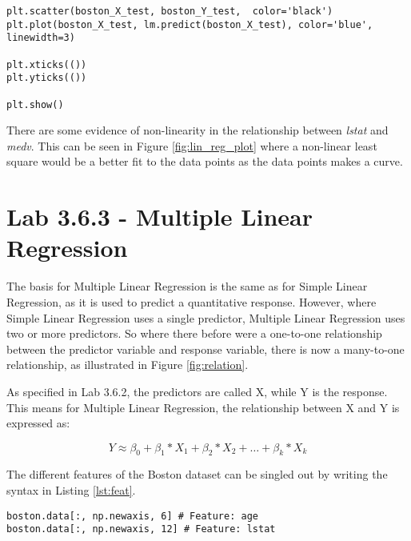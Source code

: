 \begin{lstlisting}[caption={Python Plotting of Linear Regression function}, label=lst:lin_reg_plot, mathescape=true]
plt.scatter(boston_X_test, boston_Y_test,  color='black')
plt.plot(boston_X_test, lm.predict(boston_X_test), color='blue',
linewidth=3)

plt.xticks(())
plt.yticks(())

plt.show()
\end{lstlisting}

There are some evidence of non-linearity in the relationship between \emph{lstat} and \emph{medv}. This can be seen in Figure \ref{fig:lin_reg_plot} where a non-linear least square would be a better fit to the data points as the data points makes a curve. 


\section{Lab 3.6.3 - Multiple Linear Regression}

The basis for Multiple Linear Regression is the same as for Simple Linear Regression, as it is used to predict a quantitative response. However, where Simple Linear Regression uses a single predictor, Multiple Linear Regression uses two or more predictors. So where there before were a one-to-one relationship between the predictor variable and response variable, there is now a many-to-one relationship, as illustrated in Figure \ref{fig:relation}.


\FloatBarrier
As specified in Lab 3.6.2, the predictors are called X, while Y is the response. This means for Multiple Linear Regression, the relationship between X and Y is expressed as:

\begin{equation}
Y \approx \beta_0 + \beta_1 * X_1 + \beta_2 * X_2 + … + \beta_k * X_k
\end{equation}

The different features of the Boston dataset can be singled out by writing the syntax in Listing \ref{lst:feat}. 

\begin{lstlisting}[caption={Boston features}, label=lst:feat, mathescape=true]
boston.data[:, np.newaxis, 6] # Feature: age
boston.data[:, np.newaxis, 12] # Feature: lstat
\end{lstlisting}

